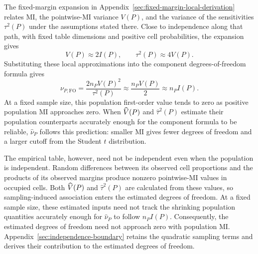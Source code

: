 The fixed-margin expansion in Appendix~\ref{sec:fixed-margin-local-derivation}
relates MI, the pointwise-MI variance \(V(P)\), and the variance of the
sensitivities \(\tau^2(P)\) under the assumptions stated there. Close to
independence along that path, with fixed table dimensions and positive
cell probabilities, the expansion gives
\begin{equation}
 V(P)\approx 2I(P),
 \qquad \tau^2(P)\approx4V(P).
 \label{eq:near-independent-moments}
\end{equation}
Substituting these local approximations into
the component degrees-of-freedom formula gives
\begin{equation}
 \nu_{P,\mathrm{FO}}=\frac{2n_PV(P)^2}{\tau^2(P)}
 \approx\frac{n_PV(P)}{2}
 \approx n_PI(P).
 \label{eq:near-independent-df}
\end{equation}
At a fixed sample size, this population first-order value tends to zero
as positive population MI approaches zero. When \(\widehat V(P)\) and
\(\widehat\tau^2(P)\) estimate their population counterparts accurately
enough for the component formula to be reliable, \(\widehat\nu_P\) follows this
prediction: smaller MI gives fewer degrees of freedom and a larger cutoff
from the Student \(t\) distribution.

The empirical table, however, need not be independent even when the
population is independent. Random differences between its observed cell
proportions and the products of its observed margins produce nonzero
pointwise-MI values in occupied cells. Both \(\widehat V(P)\) and \(\widehat\tau^2(P)\) are
calculated from these values, so sampling-induced association enters the
estimated degrees of freedom. At a fixed sample size, these estimated
inputs need not track the shrinking population quantities accurately
enough for \(\widehat\nu_P\) to follow \(n_PI(P)\). Consequently, the
estimated degrees of freedom need not approach zero with population MI.
Appendix~\ref{sec:independence-boundary} retains the quadratic sampling
terms and derives their contribution to the estimated degrees of freedom.

